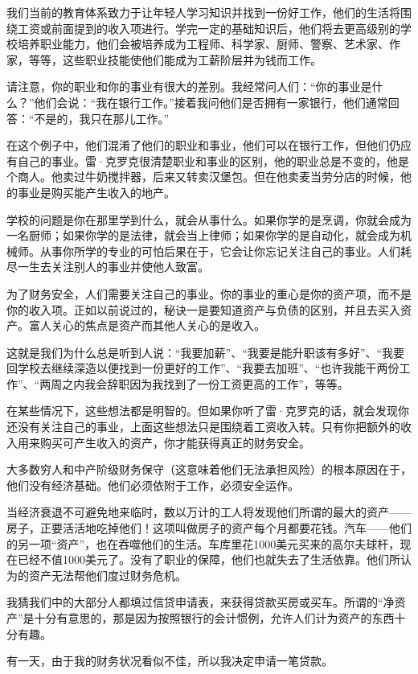 我们当前的教育体系致力于让年轻人学习知识并找到一份好工作，他们的生活将围绕工资或前面提到的收入项进行。学完一定的基础知识后，他们将去更高级别的学校培养职业能力，他们会被培养成为工程师、科学家、厨师、警察、艺术家、作家，等等，这些职业技能使他们能成为工薪阶层并为钱而工作。

请注意，你的职业和你的事业有很大的差别。我经常问人们：“你的事业是什么？”他们会说：“我在银行工作。”接着我问他们是否拥有一家银行，他们通常回答：“不是的，我只在那儿工作。”

在这个例子中，他们混淆了他们的职业和事业，他们可以在银行工作，但他们仍应有自己的事业。雷·克罗克很清楚职业和事业的区别，他的职业总是不变的，他是个商人。他卖过牛奶搅拌器，后来又转卖汉堡包。但在他卖麦当劳分店的时候，他的事业是购买能产生收入的地产。

学校的问题是你在那里学到什么，就会从事什么。如果你学的是烹调，你就会成为一名厨师；如果你学的是法律，就会当上律师；如果你学的是自动化，就会成为机械师。从事你所学的专业的可怕后果在于，它会让你忘记关注自己的事业。人们耗尽一生去关注别人的事业并使他人致富。

为了财务安全，人们需要关注自己的事业。你的事业的重心是你的资产项，而不是你的收入项。正如以前说过的，秘诀一是要知道资产与负债的区别，并且去买入资产。富人关心的焦点是资产而其他人关心的是收入。

这就是我们为什么总是听到人说：“我要加薪”、“我要是能升职该有多好”、“我要回学校去继续深造以便找到一份更好的工作”、“我要去加班”、“也许我能干两份工作”、“两周之内我会辞职因为我找到了一份工资更高的工作”，等等。

在某些情况下，这些想法都是明智的。但如果你听了雷·克罗克的话，就会发现你还没有关注自己的事业，上面这些想法只是围绕着工资收入转。只有你把额外的收入用来购买可产生收入的资产，你才能获得真正的财务安全。

大多数穷人和中产阶级财务保守（这意味着他们无法承担风险）的根本原因在于，他们没有经济基础。他们必须依附于工作，必须安全运作。

当经济衰退不可避免地来临时，数以万计的工人将发现他们所谓的最大的资产——房子，正要活活地吃掉他们！这项叫做房子的资产每个月都要花钱。汽车——他们的另一项“资产”，也在吞噬他们的生活。车库里花1000美元买来的高尔夫球杆，现在已经不值1000美元了。没有了职业的保障，他们也就失去了生活依靠。他们所认为的资产无法帮他们度过财务危机。

我猜我们中的大部分人都填过信贷申请表，来获得贷款买房或买车。所谓的“净资产”是十分有意思的，那是因为按照银行的会计惯例，允许人们计为资产的东西十分有趣。

有一天，由于我的财务状况看似不佳，所以我决定申请一笔贷款。

